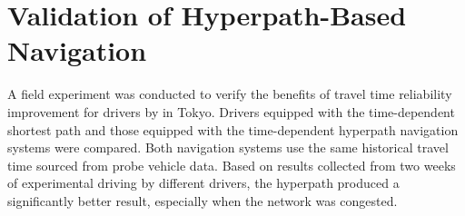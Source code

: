\section{Validation of Hyperpath-Based Navigation}
A field experiment was conducted to verify the benefits of travel time reliability improvement for drivers by \citet{Ito2015} in Tokyo. Drivers equipped with the time-dependent shortest path and those equipped with the time-dependent hyperpath navigation systems were compared. Both navigation systems use the same historical travel time sourced from probe vehicle data. Based on results collected from two weeks of experimental driving by different drivers, the hyperpath produced a significantly better result, especially when the network was congested. 

